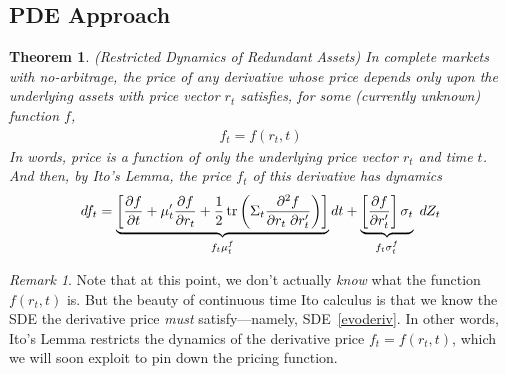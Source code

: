 \documentclass[12pt]{article}
\theoremstyle{plain}
\newtheorem{thm}{Theorem}[section]
\theoremstyle{definition}
\theoremstyle{remark}
\newtheorem*{rmk}{Remark}
\newcommand{\trace}{\operatorname{tr}}
\begin{document}
\clearpage
\subsection{PDE Approach}

\begin{comment}
- The very process of constructing a riskless portfolio, which should be
  taken care of in the part on no-arb
- if you can construct a riskless portfolio, then
  price of derivative is the some function of the underlying.
  The returns on the riskless portfolio only depends upon time.
  (Relate deriv price, asset price, time).
  Can solve for price?
\end{comment}



\begin{thm}
\emph{(Restricted Dynamics of Redundant Assets)}
\label{thm:complete}
In complete markets with no-arbitrage, the price of any derivative whose
price depends only upon the underlying assets with price vector $r_t$
satisfies, for some (currently unknown) function $f$,
\begin{align}
  f_t = f(r_t,t)
  \label{pricingfcn}
\end{align}
In words, price is a function of only the underlying price vector $r_t$
and time $t$.
And then, by Ito's Lemma, the price $f_t$ of this derivative has
dynamics
\begin{align}
  df_t
  =
  \underbrace{%
    \left[
      \frac{\partial f}{\partial t}
      +
      \mu_t'
      \frac{\partial f}{\partial r_t}
      +
      \frac{1}{2}
      \trace\left(
      \Sigma_t
      \frac{\partial^2 f}{\partial r_t\;\partial r_t'}
      \right)
    \right]
  }_{f_t\mu_t^f}
  dt
  +
  \underbrace{%
    \left[
    \frac{\partial f}{\partial r_t'}
    \right]
    \sigma_t
  }_{f_t\sigma_t^f}
  \;dZ_t
  \label{evoderiv}
\end{align}
\end{thm}
\begin{rmk}
Note that at this point, we don't actually \emph{know} what the function
$f(r_t,t)$ is.
But the beauty of continuous time Ito calculus is that we know the SDE
the derivative price \emph{must} satisfy---namely, SDE~\ref{evoderiv}.
In other words, Ito's Lemma restricts the dynamics of the derivative
price $f_t=f(r_t,t)$, which we will soon exploit to pin down the pricing
function.
\end{rmk}
\end{document}
